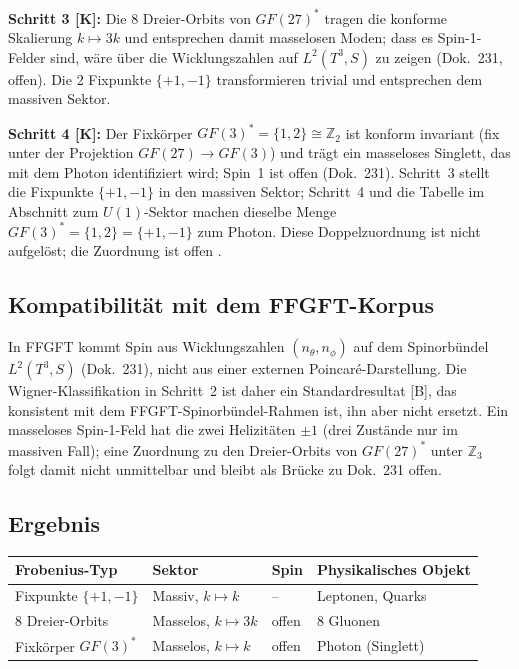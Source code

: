 \textbf{Schritt 3 [K]:} Die 8 Dreier-Orbits von $GF(27)^*$ tragen die
konforme Skalierung $k\mapsto3k$ und entsprechen damit masselosen Moden; dass
es Spin-1-Felder sind, wäre über die Wicklungszahlen auf $L^2(T^3,S)$ zu zeigen
(Dok.~231, offen).
Die 2 Fixpunkte $\{+1,-1\}$ transformieren trivial und entsprechen dem massiven
Sektor.

\textbf{Schritt 4 [K]:} Der Fixkörper $GF(3)^*=\{1,2\}\cong\mathbb{Z}_2$
ist konform invariant (fix unter der Projektion $GF(27)\to GF(3)$) und trägt
ein masseloses Singlett, das mit dem Photon identifiziert wird; Spin~1 ist
offen (Dok.~231).
Schritt~3 stellt die Fixpunkte $\{+1,-1\}$ in den massiven Sektor; Schritt~4
und die Tabelle im Abschnitt zum $U(1)$-Sektor machen dieselbe Menge
$GF(3)^*=\{1,2\}=\{+1,-1\}$ zum Photon. Diese Doppelzuordnung ist nicht
aufgelöst; die Zuordnung ist offen \SM.

\subsection{Kompatibilität mit dem FFGFT-Korpus}

In FFGFT kommt Spin aus Wicklungszahlen $(n_\theta, n_\phi)$ auf dem
Spinorbündel $L^2(T^3, S)$ (Dok.~231), nicht aus einer externen
Poincaré-Darstellung. Die Wigner-Klassifikation in Schritt~2 ist daher
ein Standardresultat [B], das konsistent mit dem FFGFT-Spinorbündel-Rahmen
ist, ihn aber nicht ersetzt. Ein masseloses Spin-1-Feld hat die zwei
Helizitäten $\pm1$ (drei Zustände nur im massiven Fall); eine Zuordnung zu den
Dreier-Orbits von $GF(27)^*$ unter $\mathbb{Z}_3$ folgt damit nicht unmittelbar
und bleibt als Brücke zu Dok.~231 offen.

\subsection{Ergebnis}

\begin{center}
\renewcommand{\arraystretch}{1.3}
\begin{tabular}{llll}
\toprule
Frobenius-Typ & Sektor & Spin & Physikalisches Objekt \\
\midrule
Fixpunkte $\{+1,-1\}$ & Massiv, $k\mapsto k$ & -- & Leptonen, Quarks \\
8 Dreier-Orbits & Masselos, $k\mapsto3k$ & offen & 8 Gluonen \\
Fixkörper $GF(3)^*$ & Masselos, $k\mapsto k$ & offen & Photon (Singlett) \\
\bottomrule
\end{tabular}
\end{center}

